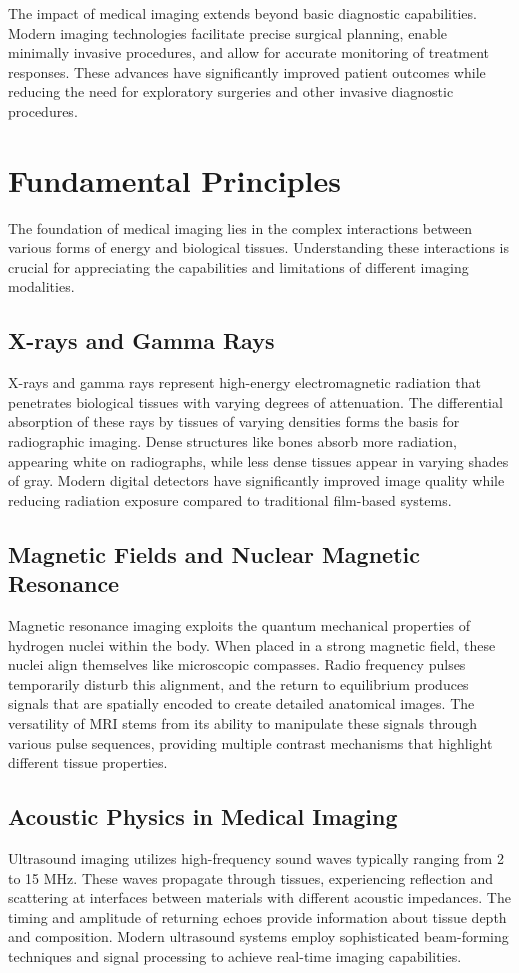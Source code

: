 \documentclass[12pt]{article}
\begin{document}
The impact of medical imaging extends beyond basic diagnostic capabilities. Modern imaging technologies facilitate precise surgical planning, enable minimally invasive procedures, and allow for accurate monitoring of treatment responses. These advances have significantly improved patient outcomes while reducing the need for exploratory surgeries and other invasive diagnostic procedures.

\section{Fundamental Principles}
The foundation of medical imaging lies in the complex interactions between various forms of energy and biological tissues. Understanding these interactions is crucial for appreciating the capabilities and limitations of different imaging modalities.

\subsection{X-rays and Gamma Rays}
X-rays and gamma rays represent high-energy electromagnetic radiation that penetrates biological tissues with varying degrees of attenuation. The differential absorption of these rays by tissues of varying densities forms the basis for radiographic imaging. Dense structures like bones absorb more radiation, appearing white on radiographs, while less dense tissues appear in varying shades of gray. Modern digital detectors have significantly improved image quality while reducing radiation exposure compared to traditional film-based systems.

\subsection{Magnetic Fields and Nuclear Magnetic Resonance}
Magnetic resonance imaging exploits the quantum mechanical properties of hydrogen nuclei within the body. When placed in a strong magnetic field, these nuclei align themselves like microscopic compasses. Radio frequency pulses temporarily disturb this alignment, and the return to equilibrium produces signals that are spatially encoded to create detailed anatomical images. The versatility of MRI stems from its ability to manipulate these signals through various pulse sequences, providing multiple contrast mechanisms that highlight different tissue properties.

\subsection{Acoustic Physics in Medical Imaging}
Ultrasound imaging utilizes high-frequency sound waves typically ranging from 2 to 15 MHz. These waves propagate through tissues, experiencing reflection and scattering at interfaces between materials with different acoustic impedances. The timing and amplitude of returning echoes provide information about tissue depth and composition. Modern ultrasound systems employ sophisticated beam-forming techniques and signal processing to achieve real-time imaging capabilities.
\end{document}

